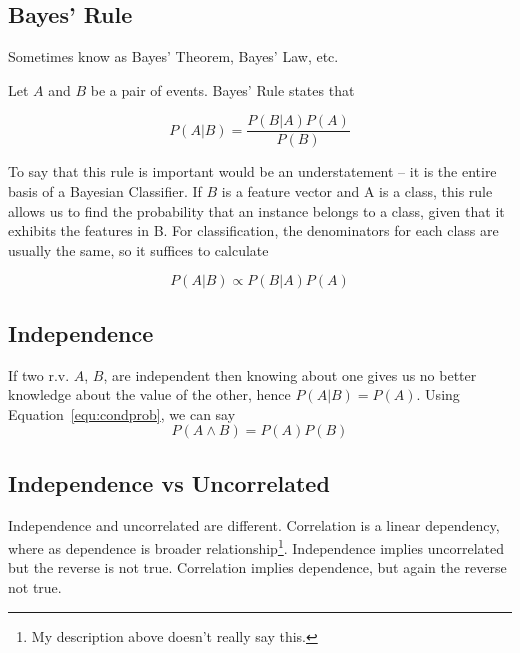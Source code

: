 \documentclass{article}
\begin{document}
    \subsection{Bayes' Rule}
    
    Sometimes know as Bayes' Theorem, Bayes' Law, etc. 
    
    Let $A$ and $B$ be a pair of events. Bayes' Rule states that
    
    \begin{equation}\label{equ:bayes_rule}
        P(A|B) = \frac{P(B|A)P(A)}{P(B)} 
    \end{equation}
    
    To say that this rule is important would be an understatement -- it is the entire basis of a Bayesian Classifier. If $B$ is a feature vector and A is a class, this rule allows us to find the probability that an instance belongs to a class, given that it exhibits the features in B. For classification, the denominators for each class are usually the same, so it suffices to calculate

    \begin{equation}
        P(A|B) \propto P(B|A)P(A) 
    \end{equation}
    

    \subsection{Independence}
        If two r.v. $A$, $B$, are independent then knowing about one gives us no better knowledge about the value of the other, hence $P(A|B)=P(A)$. Using Equation~\ref{equ:condprob}, we can say
        \begin{equation}
            P(A\wedge B)=P(A)P(B) 
        \end{equation}
        
    \subsection{Independence vs Uncorrelated}
        Independence and uncorrelated are different. Correlation is a linear dependency, where as dependence is broader relationship\footnote{My description above doesn't really say this.}. Independence implies uncorrelated but the reverse is not true. Correlation implies dependence, but again the reverse not true.
        
\end{document}
